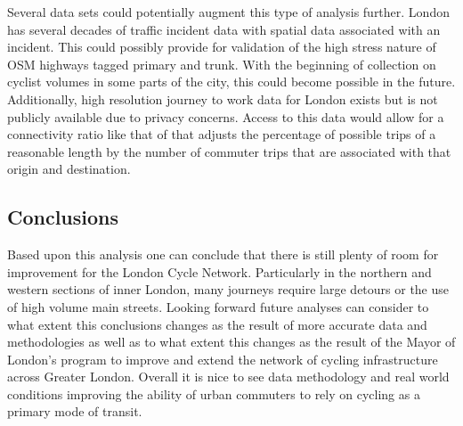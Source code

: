 Several data sets could potentially augment this type of analysis further. London has several decades of traffic incident data with spatial data associated with an incident. This could possibly provide for validation of the high stress nature of OSM highways tagged primary and trunk. With the beginning of collection on cyclist volumes in some parts of the city, this could become possible in the future.  Additionally, high resolution journey to work data for London exists but is not publicly available due to privacy concerns. Access to this data would allow for a connectivity ratio like that of \textcite{furth2016network} that adjusts the percentage of possible trips of a reasonable length by the number of commuter trips that are associated with that origin and destination. 

\subsection{Conclusions}

Based upon this analysis one can conclude that there is still plenty of room for improvement for the London Cycle Network. Particularly in the northern and western sections of inner London, many journeys require large detours or the use of high volume main streets. Looking forward future analyses can consider to what extent this conclusions changes as the result of more accurate data and methodologies as well as to what extent this changes as the result of the Mayor of London's program to improve and extend the network of cycling infrastructure across Greater London. Overall it is nice to see data methodology and real world conditions improving the ability of urban commuters to rely on cycling as a primary mode of transit. 

 